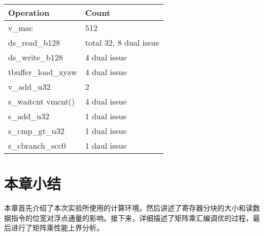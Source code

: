 \begin{table}[htbp]
	\label{tab:fijiFFMA}
	\begin{center}
		\begin{tabular}{ | l | p{4cm} |}
			\hline
			Operation & Count \\ \hline
			v\_mac & 512  \\ \hline
			ds\_read\_b128 & total 32, 8 dual issue \\ \hline
			ds\_write\_b128 & 4 dual issue \\ \hline
			tbuffer\_load\_xyzw & 4 dual issue \\ \hline
			v\_add\_u32 & 2 \\ \hline
			s\_waitcnt vmcnt() & 4 dual issue \\ \hline
			s\_add\_u32 & 1 dual issue \\ \hline
			s\_cmp\_gt\_u32 & 1 dual issue \\ \hline
			s\_cbranch\_scc0 & 1 daul issue \\
			\hline
		\end{tabular}
	\end{center}	
\end{table}


\section{本章小结}
本章首先介绍了本次实验所使用的计算环境。然后讲述了寄存器分块的大小和读数据指令的位宽对浮点通量的影响。接下来，详细描述了矩阵乘汇编调优的过程，最后进行了矩阵乘性能上界分析。


